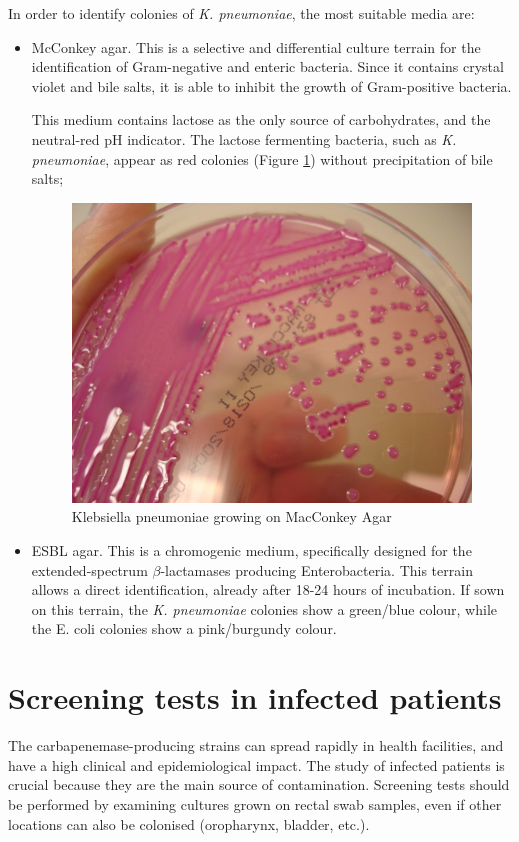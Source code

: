 \documentclass[11pt]{report}
\begin{document}
In order to identify colonies of \emph{K. pneumoniae}, the most suitable media are:
\begin{itemize}
\item McConkey agar.
This is a selective and differential culture terrain for the identification of Gram-negative and enteric bacteria.
Since it contains crystal violet and bile salts, it is able to inhibit the growth of Gram-positive bacteria. 

This medium contains lactose as the only source of carbohydrates, and the neutral-red pH indicator.
The lactose fermenting bacteria, such as \emph{K. pneumoniae}, appear as red colonies (Figure \ref{Kleb_MAC}) without precipitation of bile salts;

\begin{figure}[htp]
\centering
\includegraphics[scale=0.250]{img/KlebsiellaMAC.jpg}
\caption{Klebsiella pneumoniae growing on MacConkey Agar \cite{KlebsiellaMAC}}
\label{Kleb_MAC}
\end{figure}

\clearpage
\item ESBL agar.
This is a chromogenic medium, specifically designed for the extended-spectrum $\beta$-lactamases producing Enterobacteria. This terrain allows a direct identification, already after 18-24 hours of incubation.
If sown on this terrain, the \emph{K. pneumoniae} colonies show a green/blue colour, while the E. coli colonies show a pink/burgundy colour.
\end{itemize}

\section{Screening tests in infected patients}
The carbapenemase-producing strains can spread rapidly in health facilities, and have a high clinical and epidemiological impact.
The study of infected patients is crucial because they are the main source of contamination.
Screening tests should be performed by examining cultures grown on rectal swab samples, even if other locations can also be colonised (oropharynx, bladder, etc.).
\end{document}
